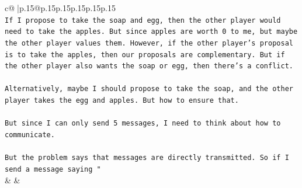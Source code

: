 \documentclass{article}
\begin{document}
{\begin{supertabular}{c@{$\;$}|p{.15\linewidth}@{}p{.15\linewidth}p{.15\linewidth}p{.15\linewidth}p{.15\linewidth}p{.15\linewidth}}
{{{\\ 
\texttt{If I propose to take the soap and egg, then the other player would need to take the apples. But since apples are worth 0 to me, but maybe the other player values them. However, if the other player's proposal is to take the apples, then our proposals are complementary. But if the other player also wants the soap or egg, then there's a conflict. } \\
\\ 
\texttt{Alternatively, maybe I should propose to take the soap, and the other player takes the egg and apples. But how to ensure that. } \\
\\ 
\texttt{But since I can only send 5 messages, I need to think about how to communicate. } \\
\\ 
\texttt{But the problem says that messages are directly transmitted. So if I send a message saying "} \\
            }
        }
    }
    & & \\ \\


\end{supertabular}}
\end{document}
